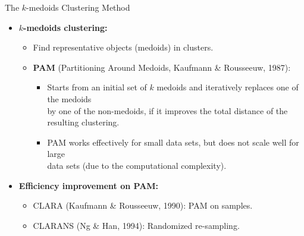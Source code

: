 \begin{frame}{The $k$-medoids Clustering Method}
	\begin{itemize}
		\item \textbf{$k$-medoids clustering:}
		      \begin{itemize}
			      \item Find representative objects (medoids) in clusters.
			      \item \textbf{PAM} (Partitioning Around Medoids, Kaufmann \&
			            Rousseeuw, 1987):
			            \begin{itemize}
				            \item Starts from an initial set of $k$ medoids and iteratively
				                  replaces one of the medoids \\
				                  by one of the non-medoids, if it improves the total distance of
				                  the resulting clustering.
				            \item PAM works effectively for small data sets, but does not
				                  scale well for large\\
				                  data sets (due to the computational complexity).
			            \end{itemize}
		      \end{itemize}
		\item \textbf{Efficiency improvement on PAM:}
		      \begin{itemize}
			      \item CLARA (Kaufmann \& Rousseeuw, 1990): PAM on samples.
			      \item CLARANS (Ng \& Han, 1994): Randomized re-sampling.
		      \end{itemize}
	\end{itemize}
\end{frame}

